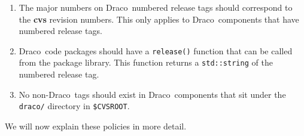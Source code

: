 \documentclass[11pt]{nmemo}
\newcommand{\draco}{{\normalfont\normalsize\sffamily Draco}}
\newcommand{\stable}{{\normalfont\normalsize\ttfamily last\_stable}}
\begin{document}
\begin{enumerate}
\item The major numbers on \draco\ numbered release tags should
  correspond to the {\bf cvs} revision numbers.  This only applies to
  \draco\ components that have numbered release tags.
\item \draco\ code packages should have a \texttt{release()} function
  that can be called from the package library.  This function returns
  a \texttt{std::string} of the numbered release tag.
\item No non-\draco\ tags should exist in \draco\ components that sit
  under the \texttt{draco/} directory in \texttt{\$CVSROOT}.
\end{enumerate}
We will now explain these policies in more detail.


\end{document}
